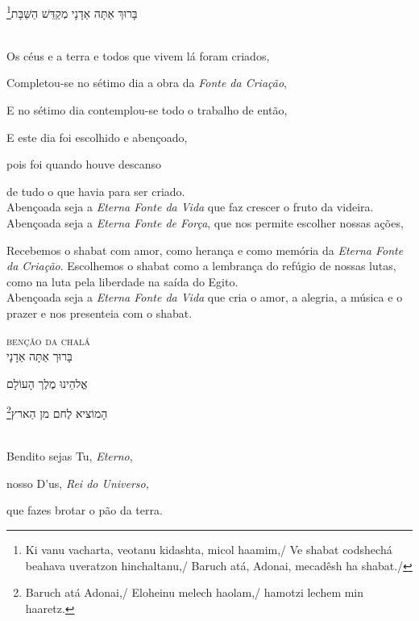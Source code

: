 בָּרוּךְ אַתָּה אַדָנָי מְקַדֵּשׁ הַשַּׁבָּת\footnote{
Ki vanu vacharta, veotanu kidashta, micol haamim,/
Ve shabat codshechá beahava uveratzon hinchaltanu,/
Baruch atá, Adonai, mecadêsh ha shabat./}

\movetooddpage
\raggedright

\textsc{}\\[15pt]

Os céus e a terra e todos que vivem lá foram criados,

Completou-se no sétimo dia a obra da \emph{Fonte da Criação},

E no sétimo dia contemplou-se todo o trabalho de então,

E este dia foi escolhido e abençoado,

pois foi quando houve descanso

de tudo o que havia para ser criado.\\[10pt]

Abençoada seja a \emph{Eterna Fonte da Vida} que faz crescer o fruto da videira.\\[10pt]

Abençoada seja a \emph{Eterna Fonte de Força}, que nos permite escolher nossas ações,

Recebemos o shabat com amor, como herança e como memória da \emph{Eterna
Fonte da Criação}. Escolhemos o shabat como a lembrança do refúgio de
nossas lutas, como na luta pela liberdade na saída do Egito.\\[10pt]

Abençoada seja a \emph{Eterna Fonte da Vida} que cria o amor, a alegria,
a música e o prazer e nos presenteia com o shabat.

\movetoevenpage
\raggedleft

\textsc{benção da chalá}\\[15pt]

בָּרוּך אַתָּה אַדָנָי

אֱלהֵינוּ מֶלֶך הָעוֹלָם

הָמוֹציא לֶחם מן הַארץ\footnote{Baruch atá Adonai,/ Eloheinu melech haolam,/ hamotzi lechem min haaretz.}

\movetooddpage
\raggedright

\textsc{}\\[15pt]

Bendito sejas Tu, \emph{Eterno},

nosso D'us, \emph{Rei do Universo,}

que fazes brotar o pão da terra.
